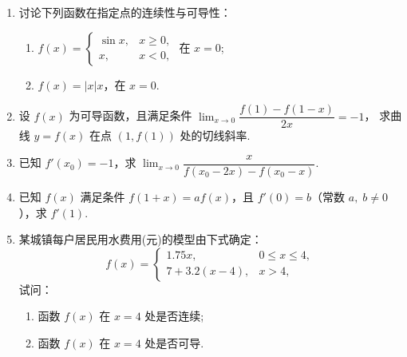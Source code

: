 \begin{enumerate}
    \item 讨论下列函数在指定点的连续性与可导性：
    \begin{enumerate}[(1)]\setlength{\itemsep}{5pt}\setlength{\topsep}{15pt}
        \item $f(x)=\begin{cases}
            \sin x,&x\geqslant0,\\
            x,&x<0,
        \end{cases}$ 在 $x=0$;
        \item $f(x)=|x|x$，在 $x=0$.
    \end{enumerate}

    \item 设 $f(x)$ 为可导函数，且满足条件 $\displaystyle\lim_{x\to0}\dfrac{f(1)-f(1-x)}{2x}=-1$，
    求曲线 $y=f(x)$ 在点 $(1,f(1))$ 处的切线斜率.

    \item 已知 $f'(x_0)=-1$，求 $\displaystyle\lim_{x\to0}\dfrac{x}{f(x_0-2x)-f(x_0-x)}$.
    
    \item 已知 $f(x)$ 满足条件 $f(1+x)=af(x)$，且 $f'(0)=b$（常数 $a,\;b\not=0$），求 $f'(1)$.
    
    \item 某城镇每户居民用水费用(元)的模型由下式确定：
    \[
        f(x)=\begin{cases}
            1.75x,&0\leqslant x\leqslant 4,\\
            7+3.2(x-4),&x>4,
        \end{cases}
    \]
    试问：\begin{minipage}[t]{10cm}
            \begin{enumerate}[(1)]
            \item 函数 $f(x)$ 在 $x=4$ 处是否连续;
            \item 函数 $f(x)$ 在 $x=4$ 处是否可导.
            \end{enumerate}
        \end{minipage}
\end{enumerate}
